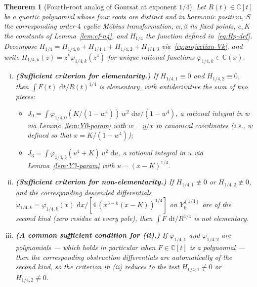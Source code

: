 \documentclass[11pt,a4paper]{article}
\theoremstyle{plain}
\newtheorem{theorem}{Theorem}[section]
\theoremstyle{definition}
\theoremstyle{remark}
\newcommand{\C}{\mathbb{C}}
\renewcommand{\d}{\,\mathrm{d}}
\begin{document}
\begin{theorem}[Fourth-root analog of Goursat at exponent $1/4$]\label{thm:main-14}
Let $R(t) \in \C[t]$ be a quartic polynomial whose four roots are distinct and in harmonic position, $S$ the corresponding order-$4$ cyclic Möbius transformation, $\alpha, \beta$ its fixed points, $c, K$ the constants of Lemma~\ref{lem:cf-n4}, and $H_{1/4}$ the function defined in~\eqref{eq:Hp-def}. Decompose $H_{1/4} = H_{1/4,0} + H_{1/4,1} + H_{1/4,2} + H_{1/4,3}$ via~\eqref{eq:projection-Vk}, and write $H_{1/4,k}(z) = z^k\varphi_{1/4,k}(z^4)$ for unique rational functions $\varphi_{1/4,k}\in\C(x)$.
\begin{enumerate}[(i)]
  \item \textbf{(Sufficient criterion for elementarity.)} If $H_{1/4,1} \equiv 0$ and $H_{1/4,2} \equiv 0$, then $\int F(t)\,\d t / R(t)^{1/4}$ is elementary, with antiderivative the sum of two pieces:
  \begin{itemize}
    \item $J_0 = \int \varphi_{1/4,0}(K/(1-w^4))\,w^2\,\d w/(1-w^4)$, a rational integral in $w$ via Lemma~\ref{lem:Y0-param} with $w = y/x$ in canonical coordinates (i.e., $w$ defined so that $x = K/(1-w^4)$);
    \item $J_3 = \int \varphi_{1/4,3}(u^4 + K)\,u^2\,\d u$, a rational integral in $u$ via Lemma~\ref{lem:Y3-param} with $u = (x-K)^{1/4}$.
  \end{itemize}
  \item \textbf{(Sufficient criterion for non-elementarity.)} If $H_{1/4,1} \not\equiv 0$ or $H_{1/4,2} \not\equiv 0$, and the corresponding descended differentials $\omega_{1/4,k} = \varphi_{1/4,k}(x)\,\d x/[4\,(x^{3-k}(x-K))^{1/4}]$ on $Y_k^{(1/4)}$ are of the second kind (zero residue at every pole), then $\int F\,\d t/R^{1/4}$ is not elementary.
  \item \textbf{(A common sufficient condition for (ii).)} If $\varphi_{1/4,1}$ and $\varphi_{1/4,2}$ are polynomials --- which holds in particular when $F\in\C[t]$ is a polynomial --- then the corresponding obstruction differentials are automatically of the second kind, so the criterion in (ii) reduces to the test $H_{1/4,1}\not\equiv 0$ or $H_{1/4,2}\not\equiv 0$.
\end{enumerate}
\end{theorem}
\end{document}
